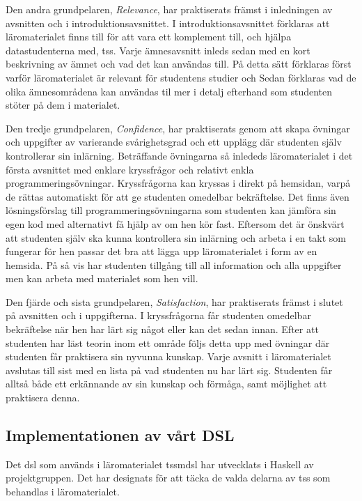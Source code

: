 \documentclass[12pt,a4paper,twoside,openright]{article}
\begin{document}
Den andra grundpelaren, \textit{Relevance}, har praktiserats främst
i inledningen av avsnitten och i introduktionsavsnittet.
I introduktionsavsnittet förklaras att läromaterialet finns till för att
vara ett komplement till, och hjälpa datastudenterna med,
\gls{tss}. Varje ämnesavsnitt inleds sedan med en kort beskrivning av
ämnet och vad det kan användas till. På detta sätt förklaras
först varför läromaterialet är relevant för studentens
studier och Sedan förklaras vad de olika ämnesområdena
kan användas til mer i detalj efterhand som studenten stöter
på dem i materialet.

Den tredje grundpelaren, \textit{Confidence}, har praktiserats genom
att skapa övningar och uppgifter av varierande svårighetsgrad och ett
upplägg där studenten själv kontrollerar sin inlärning. Beträffande
övningarna så inlededs läromaterialet i det första avsnittet med enklare
kryssfrågor och relativt enkla programmeringsövningar. Kryssfrågorna
kan kryssas i direkt på hemsidan, varpå de rättas automatiskt för att ge
studenten omedelbar bekräftelse. Det finns även lösningsförslag till
programmeringsövningarna som studenten kan jämföra sin egen kod med alternativt
få hjälp av om hen kör fast. Eftersom det är önskvärt att studenten själv ska
kunna kontrollera sin inlärning och arbeta i en takt som fungerar för
hen passar det bra att lägga upp läromaterialet i form av en
hemsida. På så vis har studenten tillgång till all information och
alla uppgifter men kan arbeta med materialet som hen vill.

Den fjärde och sista grundpelaren, \textit{Satisfaction}, har
praktiserats främst i slutet på avsnitten och i uppgifterna. I
kryssfrågorna får studenten omedelbar bekräftelse när hen har lärt sig
något eller kan det sedan innan. Efter att studenten har läst teorin
inom ett område följs detta upp med övningar där studenten får
praktisera sin nyvunna kunskap. Varje avsnitt i läromaterialet
avslutas till sist med en lista på vad studenten nu har lärt
sig. Studenten får alltså både ett erkännande av sin kunskap och
förmåga, samt möjlighet att praktisera denna.

\subsection{Implementationen av vårt DSL}
\label{sec:implDSL}
Det \gls{dsl} som används i läromaterialet \gls{tssmdsl} har
utvecklats i Haskell av projektgruppen. Det har designats för att
täcka de valda delarna av \gls{tss} som behandlas i läromaterialet.
\end{document}
